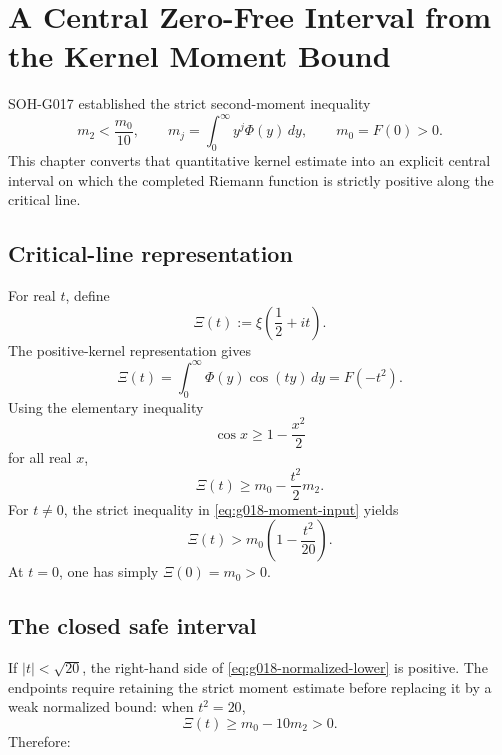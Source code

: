 \chapter{A Central Zero-Free Interval from the Kernel Moment Bound}
\label{chap:central-zero-free-interval}


SOH-G017 established the strict second-moment inequality
\begin{equation}
 m_2<\frac{m_0}{10},
 \qquad
 m_j=\int_0^\infty y^j\Phi(y)\,dy,
 \qquad
 m_0=F(0)>0.
 \label{eq:g018-moment-input}
\end{equation}
This chapter converts that quantitative kernel estimate into an explicit
central interval on which the completed Riemann function is strictly positive
along the critical line.

\section{Critical-line representation}

For real $t$, define
\[
 \Xi(t):=\xi\!\left(\frac12+it\right).
\]
The positive-kernel representation gives
\begin{equation}
 \Xi(t)
 =\int_0^\infty\Phi(y)\cos(ty)\,dy
 =F(-t^2).
 \label{eq:g018-Xi-F}
\end{equation}
Using the elementary inequality
\[
 \cos x\ge1-\frac{x^2}{2}
\]
for all real $x$,
\begin{equation}
 \Xi(t)
 \ge m_0-\frac{t^2}{2}m_2.
 \label{eq:g018-basic-lower}
\end{equation}
For $t\ne0$, the strict inequality in \cref{eq:g018-moment-input} yields
\begin{equation}
 \Xi(t)
 >m_0\left(1-\frac{t^2}{20}\right).
 \label{eq:g018-normalized-lower}
\end{equation}
At $t=0$, one has simply $\Xi(0)=m_0>0$.

\section{The closed safe interval}

If $|t|<\sqrt{20}$, the right-hand side of
\cref{eq:g018-normalized-lower} is positive.  The endpoints require retaining
the strict moment estimate before replacing it by a weak normalized bound:
when $t^2=20$,
\[
 \Xi(t)
 \ge m_0-10m_2
 >0.
\]
Therefore:

